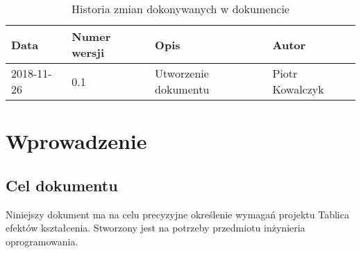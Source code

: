 \documentclass{article}
\begin{document}
\begin{titlepage}







\end{titlepage}

\addtocounter{page}{1}
\newpage

\begin{table}[h!]
	\begin{center}
		\caption{Historia zmian dokonywanych w dokumencie}
		\begin{tabular}{|l|l|l|l|}
			\hline
			Data & Numer wersji & Opis & Autor \\
		  \hline \hline
      2018-11-26 & 0.1 & Utworzenie dokumentu & Piotr Kowalczyk \\
      \hline
    \end{tabular}
	\end{center}
\end{table}	

\tableofcontents

\newpage


\section{Wprowadzenie}

\subsection{Cel dokumentu}
Niniejszy dokument ma na celu precyzyjne określenie wymagań projektu Tablica efektów kształcenia. Stworzony jest na potrzeby przedmiotu inżynieria oprogramowania.
\end{document}
